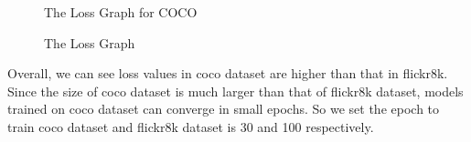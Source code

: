 \documentclass{article}
\begin{document}
\begin{figure}[h]
\centering
{}
\caption{The Loss Graph for COCO}
\label{fig3_}
\end{figure}

\begin{figure}[h]
\centering
{}
\caption{The Loss Graph}
\label{_fig3_}
\end{figure}

Overall, we can see loss values in coco dataset are higher than that in flickr8k. Since the size of coco dataset is much larger than that of flickr8k dataset, models trained on coco dataset can converge in small epochs. So we set the epoch to train coco dataset and flickr8k dataset is 30 and 100 respectively.
\end{document}
